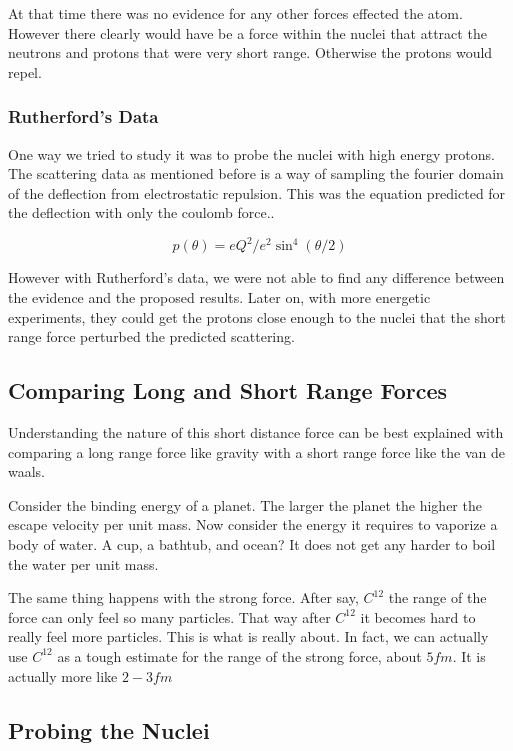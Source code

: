 \documentclass[english, 11pt]{article}
\begin{document}
At that time there was no evidence for any other forces effected the atom. However there clearly would have be a force within the nuclei that attract the neutrons and protons that were very short range. Otherwise the protons would repel.

\subsubsection{Rutherford's Data}
One way we tried to study it was to probe the nuclei with high energy protons. The scattering data as mentioned before is a way of sampling the fourier domain of the deflection from electrostatic repulsion. This was the equation predicted for the deflection with only the coulomb force..

  \[ p(\theta) = eQ^2 / e^2\sin^4(\theta/2) \]

However with Rutherford's data, we were not able to find any difference between the evidence and the proposed results. Later on, with more energetic experiments, they could get the protons close enough to the nuclei that the short range force perturbed the predicted scattering.

\subsection{Comparing Long and Short Range Forces}

Understanding the nature of this short distance force can be best explained with comparing a long range force like gravity with a short range force like the van de waals.

Consider the binding energy of a planet. The larger the planet the higher the escape velocity per unit mass. Now consider the energy it requires to vaporize a body of water. A cup, a bathtub, and ocean? It does not get any harder to boil the water per unit mass.

The same thing happens with the strong force. After say, $C^{12}$ the range of the force can only feel so many particles. That way after $C^{12}$ it becomes hard to really feel more particles. This is what  is really about. In fact, we can actually use $C^{12}$ as a tough estimate for the range of the strong force, about $5fm$. It is actually more like $2-3 fm$

\subsection{Probing the Nuclei}
\end{document}
